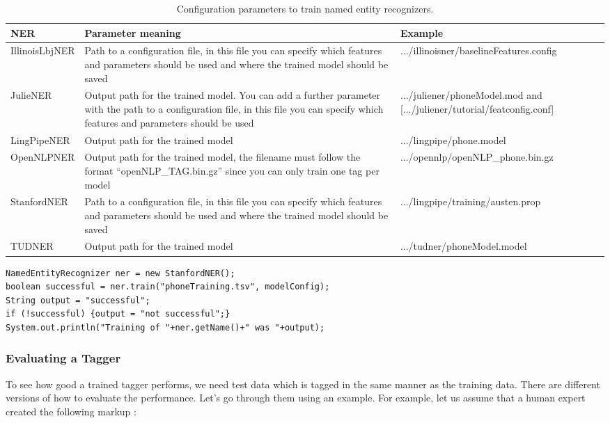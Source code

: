 \documentclass[a4paper,twoside]{book}      %
\begin{document}
\begin{table}[ht]
\centering
\begin{tabularx}{\linewidth}{|l|X|X|}
\hline
NER		& Parameter meaning & Example \\
\hline
IllinoisLbjNER	& Path to a configuration file, in this file you can specify which features and parameters should be used and where the trained model should be saved &	.../illinoisner/baselineFeatures.config \\
\hline
JulieNER	& Output path for the trained model. You can add a further parameter with the path to a configuration file, in this file you can specify which features and parameters should be used &	.../juliener/phoneModel.mod and [.../juliener/tutorial/featconfig.conf] \\
\hline
LingPipeNER	& Output path for the trained model &	.../lingpipe/phone.model \\
\hline
OpenNLPNER	& Output path for the trained model, the filename must follow the format ``openNLP\_TAG.bin.gz'' since you can only train one tag per model &	.../opennlp/openNLP\_phone.bin.gz \\
\hline
StanfordNER	& Path to a configuration file, in this file you can specify which features and parameters should be used and where the trained model should be saved &	.../lingpipe/training/austen.prop \\
\hline
TUDNER	& Output path for the trained model &	.../tudner/phoneModel.model \\
\hline
\end{tabularx} 
\caption{Configuration parameters to train named entity recognizers.}
\label{tab:nerConfig}
\end{table}

\begin{codelisting}
\begin{lstlisting}[label=listing:trainNER,caption=Train a named entity recognizer.,frame=tb]
NamedEntityRecognizer ner = new StanfordNER();
boolean successful = ner.train("phoneTraining.tsv", modelConfig);
String output = "successful";
if (!successful) {output = "not successful";}
System.out.println("Training of "+ner.getName()+" was "+output);
\end{lstlisting}
\end{codelisting}

\subsubsection{Evaluating a Tagger}
To see how good a trained tagger performs, we need test data which is tagged in the same manner as the training data. There are different versions of how to evaluate the performance. Let's go through them using an example. For example, let us assume that a human expert created the following markup \cite{nadeau2007yooname}:
\end{document}
